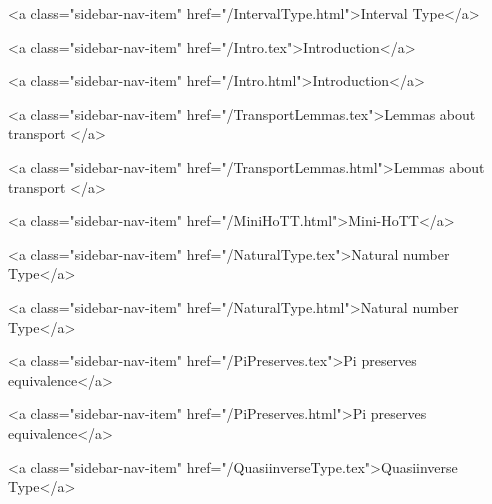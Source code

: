       
    
      
        
          <a class="sidebar-nav-item" href="/IntervalType.html">Interval Type</a>
        
      
    
      
        
          <a class="sidebar-nav-item" href="/Intro.tex">Introduction</a>
        
      
    
      
        
          <a class="sidebar-nav-item" href="/Intro.html">Introduction</a>
        
      
    
      
        
          <a class="sidebar-nav-item" href="/TransportLemmas.tex">Lemmas about transport </a>
        
      
    
      
        
          <a class="sidebar-nav-item" href="/TransportLemmas.html">Lemmas about transport </a>
        
      
    
      
        
          <a class="sidebar-nav-item" href="/MiniHoTT.html">Mini-HoTT</a>
        
      
    
      
        
          <a class="sidebar-nav-item" href="/NaturalType.tex">Natural number Type</a>
        
      
    
      
        
          <a class="sidebar-nav-item" href="/NaturalType.html">Natural number Type</a>
        
      
    
      
        
          <a class="sidebar-nav-item" href="/PiPreserves.tex">Pi preserves equivalence</a>
        
      
    
      
        
          <a class="sidebar-nav-item" href="/PiPreserves.html">Pi preserves equivalence</a>
        
      
    
      
        
          <a class="sidebar-nav-item" href="/QuasiinverseType.tex">Quasiinverse Type</a>
        
